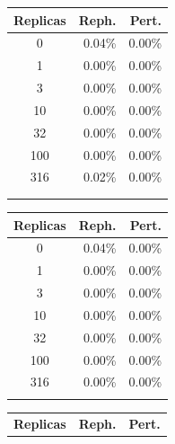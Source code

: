 \begin{table}[t!]
    \centering
    \begin{minipage}{0.32\textwidth}
        \centering
        \begin{tabular}{crr}
            \toprule
            \textbf{Replicas} & \textbf{Reph.} & \textbf{Pert.} \\
            \midrule
            0    & 0.04\% & 0.00\% \\
            1    & 0.00\% & 0.00\% \\
            3    & 0.00\% & 0.00\% \\
            10   & 0.00\% & 0.00\% \\
            32   & 0.00\% & 0.00\% \\
            100  & 0.00\% & 0.00\% \\
            316  & 0.02\% & 0.00\% \\
            \phantom{0}\\
            \phantom{0}\\
            \bottomrule
        \end{tabular}
    \end{minipage}\hfill
    \begin{minipage}{0.32\textwidth}
        \centering
        \begin{tabular}{crr}
            \toprule
            \textbf{Replicas} & \textbf{Reph.} & \textbf{Pert.} \\
            \midrule
            0    & 0.04\% & 0.00\% \\
            1    & 0.00\% & 0.00\% \\
            3    & 0.00\% & 0.00\% \\
            10   & 0.00\% & 0.00\% \\
            32   & 0.00\% & 0.00\% \\
            100  & 0.00\% & 0.00\% \\
            316  & 0.00\% & 0.00\% \\
            \phantom{0}\\
            \bottomrule
        \end{tabular}
    \end{minipage}\hfill
    \begin{minipage}{0.32\textwidth}
        \centering
        \begin{tabular}{crr}
            \toprule
            \textbf{Replicas} & \textbf{Reph.} & \textbf{Pert.} \\

\end{tabular}
\end{minipage}
\end{table}
